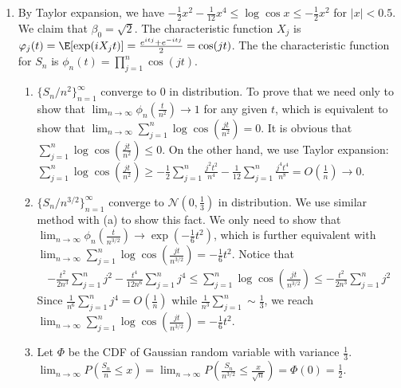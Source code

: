 \documentclass{article}
\begin{document}
\begin{enumerate}
\item By Taylor
expansion, we have $-\frac{1}{2} x^2-\frac{1}{12}  x^4 \leq \log \cos x \leq -\frac{1}{2} x^2$ for $|x|<0.5$.
We claim that $\beta_0 = \sqrt{2}$. The
characteristic function $X_j$ is $\varphi_j(t)=\E[\exp(iX_j t)]
=\frac{e^{itj}+e^{-itj}}{2}=\cos (j t)$. The the characteristic
function for $S_n$ is $\phi_n(t)=\prod_{j=1}^{n} \cos(jt)$.
\begin{enumerate}
    \item $\{S_n / n^2 \}_{n=1}^{\infty}$
    converge to $0$ in distribution. To prove that
    we need only to show that
    $\lim_{n\to \infty}\phi_n(\frac{t}{n^2}) \to 1$ for any given $t$, which is equivalent to show
    that
    $\lim_{n\to \infty} \sum_{j=1}^{n} \log \cos(\frac{jt}{n^2}) = 0$. It is obvious that
    $\sum_{j=1}^{n} \log \cos(\frac{jt}{n^2}) \leq 0$.
    On the other hand, we use Taylor expansion:
    $\sum_{j=1}^{n} \log \cos(\frac{jt}{n^2})
    \geq -\frac{1}{2}\sum_{j=1}^{n} \frac{j^2t^2}{n^4}
    -\frac{1}{12}\sum_{j=1}^{n} \frac{j^4t^4}{n^8}=O(\frac{1}{n}) \to 0$.
    \item $\{S_n / n^{3/2} \}_{n=1}^{\infty}$
    converge to $\mathcal{N}(0, \frac{1}{3})$ in distribution.
    We use similar method with (a) to show this fact.
    We only need to show that $\lim_{n\to \infty}\phi_n(\frac{t}{n^{3/2}}) \to \exp(-\frac{1}{6}t^2)$,
    which is further equivalent with
    $\lim_{n\to \infty} \sum_{j=1}^{n} \log \cos(\frac{jt}{n^{3/2}}) = -\frac{1}{6}t^2$.
    Notice that
    \begin{align*}
     -\frac{t^2}{2n^3}\sum_{j=1}^n j^2 -\frac{t^4}{12n^6}\sum_{j=1}^n j^4   \leq \sum_{j=1}^{n} \log \cos(\frac{jt}{n^{3/2}})
        \leq -\frac{t^2}{2n^3}\sum_{j=1}^n j^2
    \end{align*}
    Since $\frac{1}{n^6}\sum_{j=1}^n j^4 = O(\frac{1}{n})$
    while $\frac{1}{n^3}\sum_{j=1}^n \sim \frac{1}{3}$,
    we reach
    $\lim_{n\to \infty} \sum_{j=1}^{n} \log \cos(\frac{jt}{n^{3/2}}) = -\frac{1}{6}t^2$.
    \item Let $\Phi$ be the CDF of Gaussian random variable
    with variance $\frac{1}{3}$.
    $\lim_{n\to \infty} P(\frac{S_n}{n} \leq x)
    =\lim_{n\to \infty} P(\frac{S_n}{n^{3/2}} \leq \frac{x}{\sqrt{n}}) = \Phi(0) = \frac{1}{2}$.
\end{enumerate}


\end{enumerate}
\end{document}
